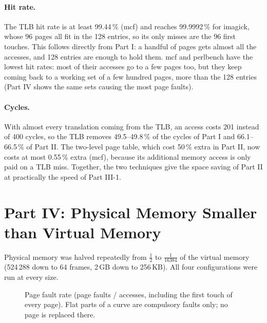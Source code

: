 \documentclass[11pt,a4paper]{article}
\newcommand{\addbench}[1]{%
  \addplot table[x index=0, y=blender]{#1}; \addplot table[x index=0, y=fotonik3d]{#1};
  \addplot table[x index=0, y=gcc]{#1};     \addplot table[x index=0, y=imagick]{#1};
  \addplot table[x index=0, y=lbm]{#1};     \addplot table[x index=0, y=mcf]{#1};
  \addplot table[x index=0, y=perlbench]{#1}; \addplot table[x index=0, y=x264]{#1};
  \addplot table[x index=0, y=xalancbmk]{#1}; \addplot table[x index=0, y=xz]{#1};
  \legend{blender,fotonik3d,gcc,imagick,lbm,mcf,perlbench,x264,xalancbmk,xz}}
\begin{document}
\paragraph{Hit rate.} The TLB hit rate is at least 99.44\,\% (mcf) and reaches 99.9992\,\% for
imagick, whose 96 pages all fit in the 128 entries, so its only misses are the 96 first touches.
This follows directly from Part I: a handful of pages gets almost all the accesses, and 128
entries are enough to hold them. mcf and perlbench have the lowest hit rates: most of their accesses go to a few
pages too, but they keep coming back to a working set of a few hundred pages, more than the 128
entries (Part IV shows the same sets causing the most page faults).

\paragraph{Cycles.} With almost every translation coming from the TLB, an access costs 201
instead of 400 cycles, so the TLB removes 49.5--49.8\,\% of the cycles of Part I and 66.1--66.5\,\%
of Part II. The two-level page table, which cost 50\,\% extra in Part II, now costs at most
0.55\,\% extra (mcf), because its additional memory access is only paid on a TLB miss. Together,
the two techniques give the space saving of Part II at practically the speed of Part III-1.

\section{Part IV: Physical Memory Smaller than Virtual Memory}

Physical memory was halved repeatedly from $\frac{1}{2}$ to $\frac{1}{16384}$ of the virtual memory
(524\,288 down to 64 frames, 2\,GB down to 256\,KB). All four configurations were run at every size.

\begin{figure}[H]
\centering
{}
\caption{Page fault rate (page faults / accesses, including the first touch of every page).
Flat parts of a curve are compulsory faults only; no page is replaced there.}
\label{fig:faultrate}
\end{figure}
\end{document}
